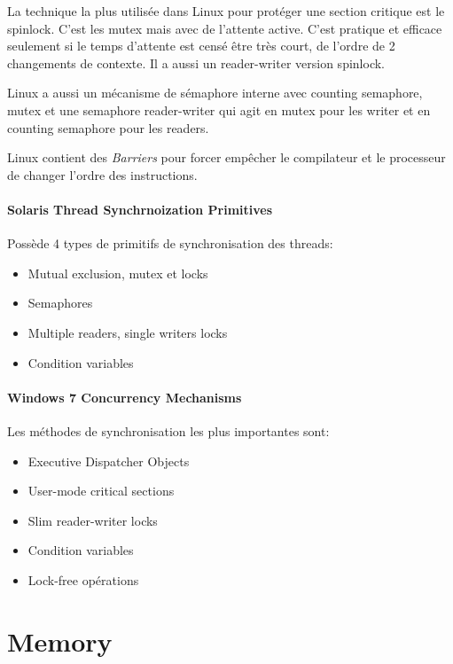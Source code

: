 La technique la plus utilisée dans Linux pour protéger une section critique est le spinlock.
C'est les mutex mais avec de l'attente active.
C'est pratique et efficace seulement si le temps d'attente est censé être très court, de l'ordre de 2 changements de contexte.
Il a aussi un reader-writer version spinlock.

Linux a aussi un mécanisme de sémaphore interne avec counting semaphore,
mutex et une semaphore reader-writer qui agit en mutex pour les writer et en counting semaphore pour les readers.

Linux contient des \emph{Barriers} pour forcer empêcher le compilateur
et le processeur de changer l'ordre des instructions.

\subsection{Solaris Thread Synchrnoization Primitives}
Possède 4 types de primitifs de synchronisation des threads:
\begin{itemize}
  \item Mutual exclusion, mutex et locks
  \item Semaphores
  \item Multiple readers, single writers locks
  \item Condition variables
\end{itemize}

\subsection{Windows 7 Concurrency Mechanisms}
Les méthodes de synchronisation les plus importantes sont:
\begin{itemize}
  \item Executive Dispatcher Objects
  \item User-mode critical sections
  \item Slim reader-writer locks
  \item Condition variables
  \item Lock-free opérations
\end{itemize}

\newpage
\part{Memory}


